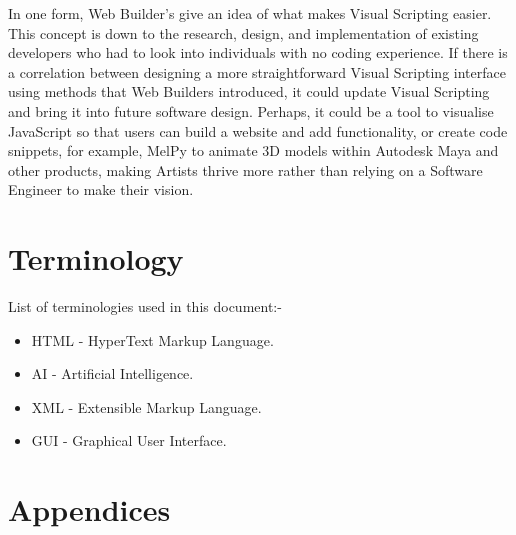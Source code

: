 \documentclass[conference]{IEEEtran}
\begin{document}
              In one form, Web Builder's give an idea of what makes Visual Scripting easier. This concept is down to the research, design, and implementation of existing developers who had to look into individuals with no coding experience. If there is a correlation between designing a more straightforward Visual Scripting interface using methods that Web Builders introduced, it could update Visual Scripting and bring it into future software design. Perhaps, it could be a tool to visualise JavaScript so that users can build a website and add functionality, or create code snippets, for example, MelPy to animate 3D models within Autodesk Maya and other products, making Artists thrive more rather than relying on a Software Engineer to make their vision.
    \section{Terminology}
      List of terminologies used in this document:-
      \begin{itemize}
        \item HTML - HyperText Markup Language.
        \item AI - Artificial Intelligence.
        \item XML - Extensible Markup Language.
        \item GUI - Graphical User Interface.
      \end{itemize}
  
    \section{Appendices}

  \nocite{*}
	\renewcommand\refname{\section{Reference List}}
	\small{
    }
\end{document}
